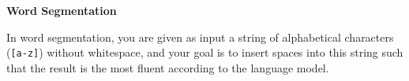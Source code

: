 \item {\bf Word Segmentation}

In word segmentation, you are given as input a string of alphabetical characters
({\tt [a-z]}) without whitespace, and your goal is to insert spaces into this
string such that the result is the most fluent according to the language model.

\begin{enumerate}

  

  

  

\end{enumerate}
